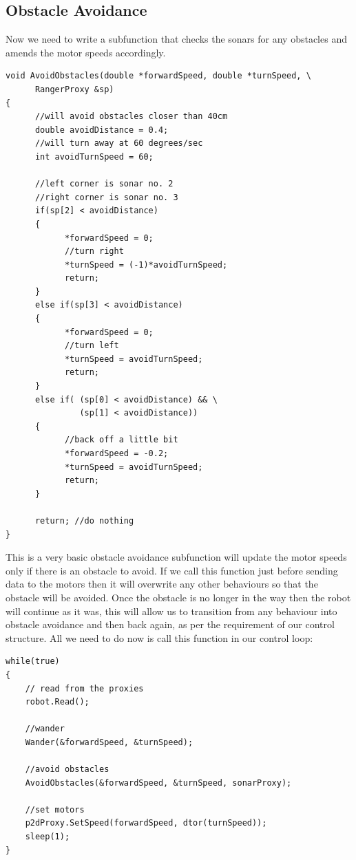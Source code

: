 \documentclass[a4paper]{report}
\begin{document}
\subsection{Obstacle Avoidance}
Now we need to write a subfunction that checks the sonars for any obstacles and amends the motor speeds accordingly.
\begin{verbatim}
void AvoidObstacles(double *forwardSpeed, double *turnSpeed, \
      RangerProxy &sp)
{
      //will avoid obstacles closer than 40cm
      double avoidDistance = 0.4;
      //will turn away at 60 degrees/sec
      int avoidTurnSpeed = 60;
      
      //left corner is sonar no. 2
      //right corner is sonar no. 3
      if(sp[2] < avoidDistance)
      {
            *forwardSpeed = 0;
            //turn right
            *turnSpeed = (-1)*avoidTurnSpeed;
            return;
      }
      else if(sp[3] < avoidDistance)
      {
            *forwardSpeed = 0;
            //turn left
            *turnSpeed = avoidTurnSpeed;
            return;
      }
      else if( (sp[0] < avoidDistance) && \
               (sp[1] < avoidDistance))
      {
            //back off a little bit
            *forwardSpeed = -0.2;
            *turnSpeed = avoidTurnSpeed;  
            return;
      }
      
      return; //do nothing
}
\end{verbatim}
This is a very basic obstacle avoidance subfunction will update the motor speeds only if there is an obstacle to avoid. If we call this function just before sending data to the motors then it will overwrite any other behaviours so that the obstacle will be avoided. Once the obstacle is no longer in the way then the robot will continue as it was, this will allow us to transition from any behaviour into obstacle avoidance and then back again, as per the requirement of our control structure. All we need to do now is call this function in our control loop:
\begin{verbatim}
while(true)
{		
    // read from the proxies
    robot.Read();
		
    //wander
    Wander(&forwardSpeed, &turnSpeed);
		
    //avoid obstacles
    AvoidObstacles(&forwardSpeed, &turnSpeed, sonarProxy);
		
    //set motors
    p2dProxy.SetSpeed(forwardSpeed, dtor(turnSpeed));
    sleep(1);
}
\end{verbatim}
\end{document}
